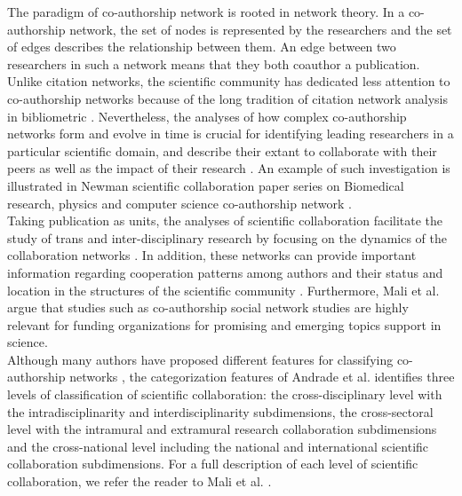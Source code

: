 The paradigm of co-authorship network is rooted in network theory. In a co-authorship network, the set of nodes is represented by the researchers and the set of edges describes the relationship between them. An edge between two researchers in such a network means that they both coauthor a publication. Unlike citation networks, the scientific community has dedicated less attention to co-authorship networks because of the long tradition of citation network analysis in bibliometric \cite{newman_structure_2001,newman_coauthorship_2004}. Nevertheless, the analyses of how complex co-authorship networks form and evolve in time is crucial for identifying leading researchers in a particular scientific domain, and describe their extant to collaborate with their peers as well as the impact of their research \cite{gonzalez-alcaide_scientific_2012}. An example of such investigation is illustrated in Newman scientific collaboration paper series on Biomedical research, physics and computer science co-authorship network \cite{newman_structure_2001,newman_coauthorship_2004,newman_scientific_2001,newman_scientific_2001-1}.\\
Taking publication as units, the analyses of scientific collaboration facilitate the study of trans and inter-disciplinary research by focusing on the dynamics of the collaboration networks \cite{borner_visualizing_2003}.  In addition, these networks can provide important information regarding cooperation patterns among authors and their status and location in the structures of the scientific community \cite{scharnhorst_models_2012}. Furthermore, Mali et al. \cite{mali_dynamic_2012} argue that studies such as co-authorship social network studies are highly relevant for funding organizations for promising and emerging topics support in science.\\
Although many authors have proposed different features for classifying co-authorship networks \cite{andrade_dimensions_2009,rogers_obstacles_2001,sonnenwald_scientific_2007}, the categorization features of Andrade et al. \cite{andrade_dimensions_2009} identifies three levels of classification of scientific collaboration: the cross-disciplinary level with the intradisciplinarity and interdisciplinarity subdimensions, the cross-sectoral level with the intramural and extramural research collaboration subdimensions and the cross-national level including the national and international scientific collaboration subdimensions. For a full description of each level of scientific collaboration, we refer the reader to Mali et al. \cite{mali_dynamic_2012}. \\%
